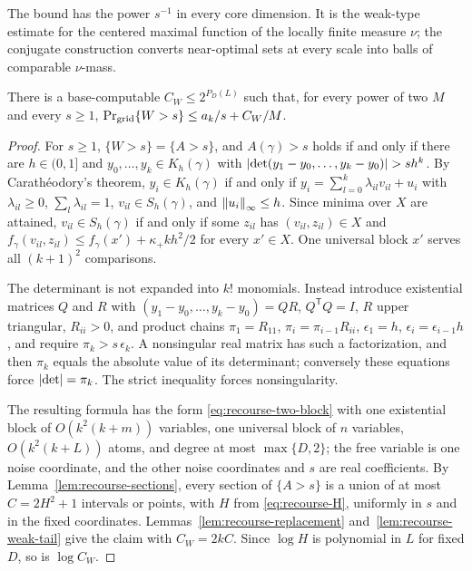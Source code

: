 The bound has the power $s^{-1}$ in every core dimension. It is the
weak-type estimate for the centered maximal function of the locally
finite measure $\nu$; the conjugate construction converts near-optimal
sets at every scale into balls of comparable $\nu$-mass.

\begin{lemma}
\label{lem:recourse-count-formula}
There is a base-computable $C_W\le2^{P_D(L)}$ such that, for every
power of two $M$ and every $s\ge1$,
$\Pr_{\rm grid}\{W>s\}\le a_k/s+C_W/M$.
\end{lemma}

\begin{proof}
For $s\ge1$, $\{W>s\}=\{A>s\}$, and $A(\gamma)>s$ holds if and only if
there are $h\in(0,1]$ and $y_0,\ldots,y_k\in K_h(\gamma)$ with
$\left\lvert\det(y_1-y_0,\ldots,y_k-y_0)\right\rvert>sh^k$. By Carath\'eodory's theorem,
$y_i\in K_h(\gamma)$ if and only if
$y_i=\sum_{l=0}^k\lambda_{il}v_{il}+u_i$ with $\lambda_{il}\ge0$,
$\sum_l\lambda_{il}=1$, $v_{il}\in S_h(\gamma)$, and
$\left\lVert u_i\right\rVert_\infty\le h$. Since minima over $X$ are attained,
$v_{il}\in S_h(\gamma)$ if and only if some $z_{il}$ has
$(v_{il},z_{il})\in X$ and
$f_\gamma(v_{il},z_{il})\le f_\gamma(x')+\kappa_+kh^2/2$ for every
$x'\in X$. One universal block $x'$ serves all $(k+1)^2$ comparisons.

The determinant is not expanded into $k!$ monomials. Instead introduce
existential matrices $Q$ and $R$ with
$(y_1-y_0,\ldots,y_k-y_0)=QR$, $Q^{\mathsf T}Q=I$, $R$ upper triangular,
$R_{ii}>0$, and product chains $\pi_1=R_{11}$,
$\pi_i=\pi_{i-1}R_{ii}$, $\epsilon_1=h$, $\epsilon_i=\epsilon_{i-1}h$,
and require $\pi_k>s\,\epsilon_k$. A nonsingular real matrix has such a
factorization, and then $\pi_k$ equals the absolute value of its
determinant; conversely these equations force $\left\lvert\det\right\rvert=\pi_k$. The
strict inequality forces nonsingularity.

The resulting formula has the form \eqref{eq:recourse-two-block} with
one existential block of $O(k^2(k+m))$ variables, one universal block
of $n$ variables, $O(k^2(k+L))$ atoms, and degree at most $\max\{D,2\}$;
the free variable is one noise coordinate, and the other noise
coordinates and $s$ are real coefficients. By
Lemma~\ref{lem:recourse-sections}, every section of $\{A>s\}$ is a
union of at most $C=2H^2+1$ intervals or points, with $H$ from
\eqref{eq:recourse-H}, uniformly in $s$ and in the fixed coordinates.
Lemmas~\ref{lem:recourse-replacement} and~\ref{lem:recourse-weak-tail}
give the claim with $C_W=2kC$. Since $\log H$ is polynomial in $L$ for
fixed $D$, so is $\log C_W$.
\end{proof}

